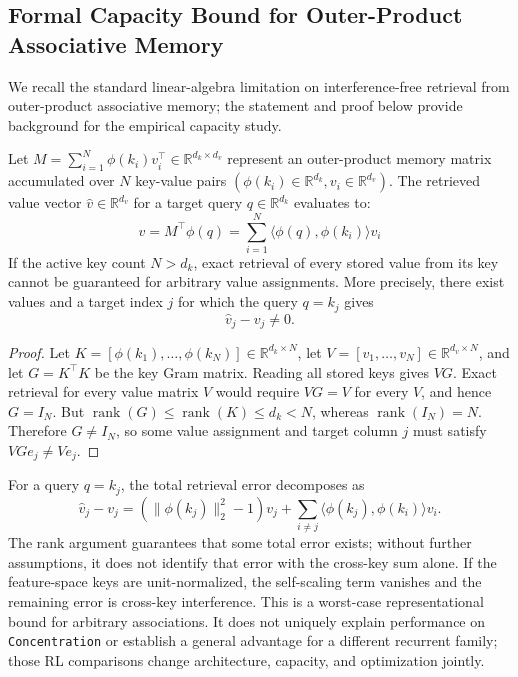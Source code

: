 \subsection{Formal Capacity Bound for Outer-Product Associative Memory}
\label{app:capacity_bound_sec}
We recall the standard linear-algebra limitation on interference-free retrieval from outer-product associative memory; the statement and proof below provide background for the empirical capacity study.
\begin{theorem}
\label{thm:capacity_bound}
Let $M = \sum_{i=1}^N \phi(k_i) v_i^\top \in \mathbb{R}^{d_k \times d_v}$ represent an outer-product memory matrix accumulated over $N$ key-value pairs $(\phi(k_i) \in \mathbb{R}^{d_k}, v_i \in \mathbb{R}^{d_v})$. The retrieved value vector $\hat{v} \in \mathbb{R}^{d_v}$ for a target query $q \in \mathbb{R}^{d_k}$ evaluates to:
\begin{equation}
    \hat{v} = M^\top \phi(q) = \sum_{i=1}^N \langle \phi(q), \phi(k_i) \rangle v_i
\end{equation}
If the active key count $N>d_k$, exact retrieval of every stored value from its key cannot be guaranteed for arbitrary value assignments. More precisely, there exist values and a target index $j$ for which the query $q=k_j$ gives
\begin{equation}
    \hat{v}_j-v_j \neq 0.
\end{equation}
\end{theorem}
\begin{proof}
Let $K=[\phi(k_1),\ldots,\phi(k_N)]\in\mathbb{R}^{d_k\times N}$, let $V=[v_1,\ldots,v_N]\in\mathbb{R}^{d_v\times N}$, and let $G=K^\top K$ be the key Gram matrix. Reading all stored keys gives $VG$. Exact retrieval for every value matrix $V$ would require $VG=V$ for every $V$, and hence $G=I_N$. But $\operatorname{rank}(G)\leq\operatorname{rank}(K)\leq d_k<N$, whereas $\operatorname{rank}(I_N)=N$. Therefore $G\neq I_N$, so some value assignment and target column $j$ must satisfy $VG e_j\neq V e_j$.
\end{proof}
For a query $q=k_j$, the total retrieval error decomposes as
\begin{equation}
    \hat{v}_j-v_j
    = \left(\lVert\phi(k_j)\rVert_2^2-1\right)v_j
    + \sum_{i\neq j}\langle\phi(k_j),\phi(k_i)\rangle v_i.
\end{equation}
The rank argument guarantees that some total error exists; without further assumptions, it does not identify that error with the cross-key sum alone. If the feature-space keys are unit-normalized, the self-scaling term vanishes and the remaining error is cross-key interference. This is a worst-case representational bound for arbitrary associations. It does not uniquely explain performance on \texttt{Concentration} or establish a general advantage for a different recurrent family; those RL comparisons change architecture, capacity, and optimization jointly.

